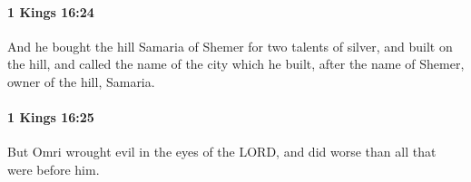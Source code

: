 		\paragraph{1 Kings 16:24} %
			\label{1KINGS-16-24}

			And he bought the hill Samaria of Shemer for two talents of silver, and built on the hill, and called the name of the city which he built, after the name of Shemer, owner of the hill, Samaria.


		\paragraph{1 Kings 16:25} %
			\label{1KINGS-16-25}

			But Omri wrought evil in the eyes of the LORD, and did worse than all that were before him.



